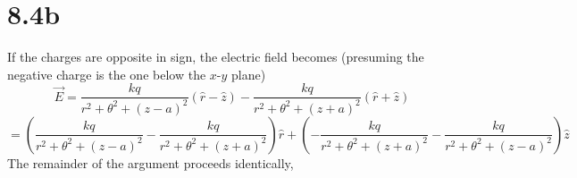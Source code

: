 \documentclass{article}
\begin{document}
\section*{8.4b}
If the charges are opposite in sign, the electric field becomes (presuming the negative charge is the one below the $x$-$y$ plane)
\[\vec{E}=\frac{kq}{r^2+\theta^2+(z-a)^2}(\hat{r}-\hat{z})-\frac{kq}{r^2+\theta^2+(z+a)^2}(\hat{r}+\hat{z})\]
\[=\left( \frac{kq}{r^2+\theta^2+(z-a)^2}-\frac{kq}{r^2+\theta^2+(z+a)^2}\right)\hat{r}+\left( -\frac{kq}{r^2+\theta^2+(z+a)^2}-\frac{kq}{r^2+\theta^2+(z-a)^2}\right)\hat{z}\]
The remainder of the argument proceeds identically,
\end{document}
